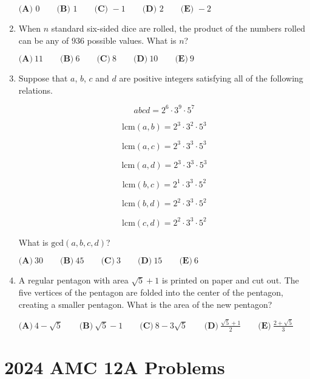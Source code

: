 \documentclass{article}
\begin{document}
\begin{enumerate}[label=\arabic*., itemsep=0.5em]
\(\textbf{(A) } 0 \qquad \textbf{(B) } 1 \qquad \textbf{(C) } -1 \qquad \textbf{(D) } 2 \qquad \textbf{(E) } -2\)\par \vspace{0.5em}\item When \(n\) standard six-sided dice are rolled, the product of the numbers rolled can be any of \(936\) possible values. What is \(n\)?

\(\textbf{(A)}~11\qquad\textbf{(B)}~6\qquad\textbf{(C)}~8\qquad\textbf{(D)}~10\qquad\textbf{(E)}~9\)\par \vspace{0.5em}\item Suppose that \(a\), \(b\), \(c\) and \(d\) are positive integers satisfying all of the following relations.


\begin{equation*}
abcd=2^6\cdot 3^9\cdot 5^7
\end{equation*}


\begin{equation*}
\text{lcm}(a,b)=2^3\cdot 3^2\cdot 5^3
\end{equation*}


\begin{equation*}
\text{lcm}(a,c)=2^3\cdot 3^3\cdot 5^3
\end{equation*}


\begin{equation*}
\text{lcm}(a,d)=2^3\cdot 3^3\cdot 5^3
\end{equation*}


\begin{equation*}
\text{lcm}(b,c)=2^1\cdot 3^3\cdot 5^2
\end{equation*}


\begin{equation*}
\text{lcm}(b,d)=2^2\cdot 3^3\cdot 5^2
\end{equation*}


\begin{equation*}
\text{lcm}(c,d)=2^2\cdot 3^3\cdot 5^2
\end{equation*}


What is \(\text{gcd}(a,b,c,d)\)?

\(\textbf{(A)}~30\qquad\textbf{(B)}~45\qquad\textbf{(C)}~3\qquad\textbf{(D)}~15\qquad\textbf{(E)}~6\)\par \vspace{0.5em}\item A regular pentagon with area \(\sqrt{5}+1\) is printed on paper and cut out. The five vertices of the pentagon are folded into the center of the pentagon, creating a smaller pentagon. What is the area of the new pentagon?

\(\textbf{(A)}~4-\sqrt{5}\qquad\textbf{(B)}~\sqrt{5}-1\qquad\textbf{(C)}~8-3\sqrt{5}\qquad\textbf{(D)}~\frac{\sqrt{5}+1}{2}\qquad\textbf{(E)}~\frac{2+\sqrt{5}}{3}\)\par \vspace{0.5em}\end{enumerate}\newpage\section*{2024 AMC 12A Problems}
\end{document}

